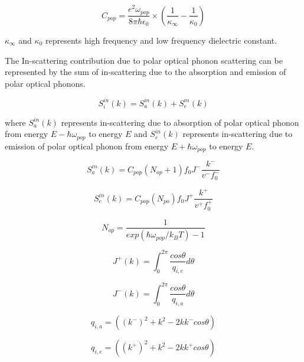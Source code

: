 \documentclass[12pt]{article}
\begin{document}
\begin{equation}
C_{pop} = \frac{e^2 \omega_{pop}}{8 \pi \hbar \epsilon_0} \times \left( \frac{1}{\kappa_{\infty}} - \frac{1}{\kappa_0} \right) 
\label{pop_const}
\end{equation}

$\kappa_{\infty}$ and $\kappa_{0}$ represents high frequency and low frequency dielectric constant.
 
The In-scattering contribution due to polar optical phonon scattering can be represented by the sum of in-scattering due to the absorption and emission of polar optical phonons. 

\begin{equation}
S_i^{in}(k) = S_a^{in}(k) + S_e^{in}(k)
\label{in_sc_pop}
\end{equation}

where $S_a^{in}(k)$ represents in-scattering due to absorption of polar optical phonon from energy $E-\hbar \omega_{pop}$ to energy $E$ and $S_e^{in}(k)$ represents in-scattering due to emission of polar optical phonon from energy $E+\hbar \omega_{pop}$ to energy $E$.
   
\begin{equation}
S_{a}^{in}(k) = C_{pop} (N_{op}+1) f_{0}  J^- \frac{k^-}{v ^-f_{0}^-}
\label{ab_in_sc_pop}
\end{equation}

\begin{equation}
S_{e}^{in}(k) = C_{pop} (N_{po}) f_{0}  J^+\frac{k^+}{v^+ f_{0}^+}
\label{ab_in_sc_pop}
\end{equation}


\begin{equation}
N_{op} = \frac{1}{exp(\hbar\omega_{pop}/k_B T) - 1}
\label{N}
\end{equation}

\begin{equation}
J^{+}(k) = \int_0^{2\pi} \frac{cos \theta}{q_{i,e}}  d\theta 
\label{J_plus}
\end{equation}

\begin{equation}
J^{-}(k) = \int_0^{2\pi} \frac{cos \theta}{q_{i,a}} d\theta 
\label{J_plus}
\end{equation}

\begin{equation}
q_{i,a} = \left( \left( k^{-}\right)^2 + k^2 - 2k k^{-} cos \theta \right)
\label{q_ab}
\end{equation}

\begin{equation}
q_{i,e} = \left( \left( k^{+}\right)^2 + k^2  - 2k k^{+} cos \theta \right)
\label{q_em}
\end{equation}
\end{document}
